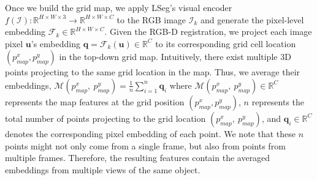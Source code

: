 \documentclass[letterpaper, 10 pt, conference]{ieeeconf}  %
\begin{document}
Once we build the grid map, we apply LSeg's visual encoder $f(\mathcal{I}): \mathbb{R}^{H \times W \times 3} \rightarrow \mathbb{R}^{H \times W \times C}$ to the RGB image $\mathcal{I}_{k}$ and generate the pixel-level embedding $\mathcal{F}_{k} \in \mathbb{R}^{H \times W \times C}$. Given the RGB-D registration, we project each image pixel $\mathbf{u}$'s embedding $\mathbf{q} = \mathcal{F}_{k}(\mathbf{u}) \in \mathbb{R}^{C}$ to its corresponding grid cell location $(p^{x}_{map}, p^{y}_{map})$ in the top-down grid map.  Intuitively, there exist multiple 3D points projecting to the same grid location in the map. Thus, we average their embeddings, $\mathcal{M} ( p^{x}_{map},\ p^{y}_{map} ) = \frac{1}{n}  \sum_{i=1}^{n} \mathbf{q}_i$
where $\mathcal{M} ( p^{x}_{map},\ p^{y}_{map} ) \in \mathbb{R}^{C}$ represents the map features at the grid position $(p^{x}_{map}, p^{y}_{map})$, $n$ represents the total number of points projecting to the grid location $(p^{x}_{map},\ p^{y}_{map})$, and $\mathbf{q}_i \in \mathbb{R}^{C}$ denotes the corresponding pixel embedding of each point. We note that these $n$ points might not only come from a single frame, but also from points from multiple frames. Therefore, the resulting features contain the averaged embeddings from multiple views of the same object. 
\end{document}

